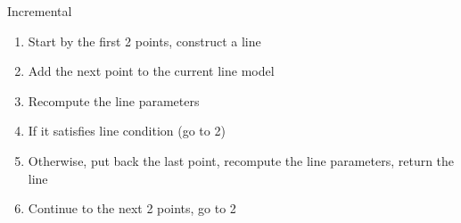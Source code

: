 \documentclass[../Head/Main.tex]{subfiles}
\begin{document}
	\begin{Pseudo}{Incremental}{}
	\begin{enumerate}
		\item Start by the first 2 points, construct a line
		\item Add the next point to the current line model
		\item Recompute the line parameters
		\item If it satisfies line condition (go to 2)
		\item Otherwise, put back the last point, recompute the line parameters, return the line
		\item Continue to the next 2 points, go to 2
	\end{enumerate}
\end{Pseudo}
\end{document}
